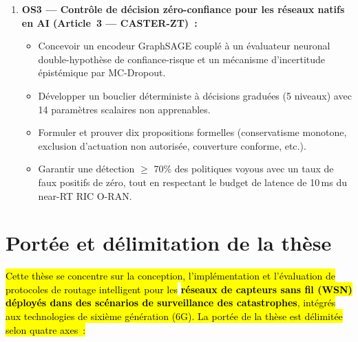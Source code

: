 \begin{enumerate}
    \item \textbf{OS3 --- Contrôle de décision zéro-confiance pour les réseaux natifs en AI (Article~3 --- CASTER-ZT)~:}
    \begin{itemize}
        \item Concevoir un encodeur GraphSAGE couplé à un évaluateur neuronal double-hypothèse de confiance-risque et un mécanisme d'incertitude épistémique par MC-Dropout.
        \item Développer un bouclier déterministe à décisions graduées (5 niveaux) avec 14 paramètres scalaires non apprenables.
        \item Formuler et prouver dix propositions formelles (conservatisme monotone, exclusion d'actuation non autorisée, couverture conforme, etc.).
        \item Garantir une détection $\geq$ 70\% des politiques voyous avec un taux de faux positifs de zéro, tout en respectant le budget de latence de 10\,ms du near-RT RIC O-RAN.
    \end{itemize}
\end{enumerate}


\section{Portée et délimitation de la thèse}\label{sec:Portee}

\hl{Cette thèse se concentre sur la conception, l'implémentation et l'évaluation de protocoles de routage intelligent pour les} \textbf{\hl{réseaux de capteurs sans fil (WSN) déployés dans des scénarios de surveillance des catastrophes}}\hl{, intégrés aux technologies de sixième génération (6G). La portée de la thèse est délimitée selon quatre axes~:}

